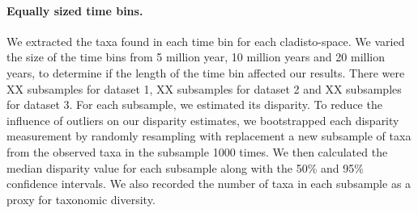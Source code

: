 \documentclass[12pt,a4paper]{article}
\begin{document}
\paragraph{Equally sized time bins.}
We extracted the taxa found in each time bin for each cladisto-space.
We varied the size of the time bins from 5 million year, 10 million years and 20 million years, to determine if the length of the time bin affected our results.
There were XX subsamples for dataset 1, XX subsamples for dataset 2 and XX subsamples for dataset 3.
For each subsample, we estimated its disparity.
To reduce the influence of outliers on our disparity estimates, we bootstrapped each disparity measurement by randomly resampling with replacement a new subsample of taxa from the observed taxa in the subsample 1000 times.
We then calculated the median disparity value for each subsample along with the 50\% and 95\% confidence intervals.
We also recorded the number of taxa in each subsample as a proxy for taxonomic diversity.
\end{document}
